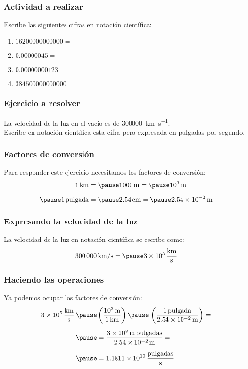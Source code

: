 \documentclass[14pt]{beamer}
\begin{document}
\begin{frame}
\frametitle{Actividad a realizar}
Escribe las siguientes cifras en notación científica:
\begin{enumerate}[<+->]
\item $16200000000000 =$%
\item $0.00000045 = $ %
\item $0.00000000123 = $ %
\item $384500000000000 = $ %
\end{enumerate}
\end{frame}
\begin{frame}
\frametitle{Ejercicio a resolver}
La velocidad de la luz en el vacío es de \SI[per-mode=symbol]{300000}{\kilo\meter\per\second}.
\\
\bigskip
\pause
Escribe en notación científica esta cifra pero expresada en pulgadas por segundo.
\end{frame}
\begin{frame}
\frametitle{Factores de conversión}
Para responder este ejercicio necesitamos los factores de conversión:
\pause
\begin{eqnarray*}
\begin{aligned}
\SI{1}{\kilo\meter} &= \pause \SI{1000}{\meter} = \pause \SI{d3}{\meter} \\[0.5em] \pause
1 \, \text{pulgada} &= \pause \SI{2.54}{\centi\meter} = \pause \SI{2.54d-2}{\meter}
\end{aligned}
\end{eqnarray*}
\end{frame}
\begin{frame}
\frametitle{Expresando la velocidad de la luz}
La velocidad de la luz en notación científica se escribe como:
\pause
\begin{eqnarray*}
\begin{aligned}
\SI[per-mode=symbol]{300000}{\kilo\meter\per\second} = \pause \SI[per-mode=fraction]{3d5}{\kilo\meter\per\second}
\end{aligned}
\end{eqnarray*}
\end{frame}
\begin{frame}
\frametitle{Haciendo las operaciones}
Ya podemos ocupar los factores de conversión:
\pause
\begin{eqnarray*}
\begin{aligned}
\SI[per-mode=fraction]{3d5}{\kilo\meter\per\second} \, \pause &\left( \dfrac{\SI{d3}{\meter}}{\SI{1}{\kilo\meter}} \right) \pause \, \left( \dfrac{1 \, \text{pulgada}}{\SI{2.54d-2}{\meter}} \right) = \\[0.5em] \pause
&= \dfrac{\SI{3d8}{\meter} \, \text{pulgadas}}{\SI{2.54d-2}{\meter}} = \\[0.5em] \pause 
&= \num{1.1811d10} \, \dfrac{\text{pulgadas}}{\unit{\second}}
\end{aligned}
\end{eqnarray*}
\end{frame}
\end{document}
